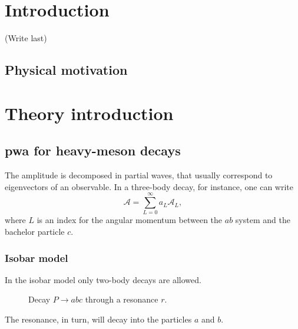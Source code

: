 \documentclass[
	fontsize=10pt,
	open=right,
	twoside,
    english,
    draft,
]{scrbook}
\title{}
\subtitle{}
\author{
  
}
\date{}
\newcommand{\A}{\ensuremath{\mathcal{A}}}
\begin{document}
%
\frontmatter
{}
	\maketitle
	\thispagestyle{empty}

	\cleardoublepage
{}
	

	\cleardoublepage
{}
	

	\cleardoublepage
{}
	

	\cleardoublepage
{}
	\tableofcontents

%
\mainmatter

\chapter{Introduction}

(Write last)
    \section{Physical motivation}

\chapter{Theory introduction}

    \section{\acs{pwa} for heavy-meson decays}

    The amplitude is decomposed in partial waves, that usually correspond to eigenvectors of an observable.
    In a three-body decay, for instance, one can write
    \begin{equation}\label{eq:pwa_ang_mom}
        \A = \sum_{L=0}^\infty a_L \A_L,
    \end{equation}
    where $L$ is an index for the angular momentum between the $ab$ system and the bachelor particle $c$.

        \subsection{Isobar model}
        In the isobar model only two-body decays are allowed.
        \begin{figure}
            \centering
            
            \caption{Decay $P\to abc$ through a resonance $r$.}
        \end{figure}
        The resonance, in turn, will decay into the particles $a$ and $b$.
\end{document}
